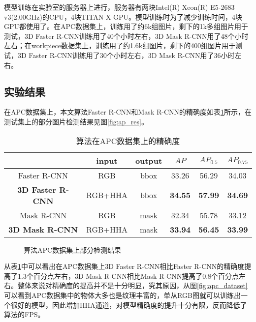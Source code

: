 {\kai 模型训练}在实验室的服务器上进行，服务器有两块Intel(R) Xeon(R) E5-2683 v3(2.00GHz)的CPU，4块TITAN X GPU。模型训练时为了减少训练时间，4块GPU都使用了。在APC数据集上，训练用了约6k组图片，剩下的1k多组图片用于测试，3D Faster R-CNN训练用了40个小时左右，3D Mask R-CNN用了48个小时左右；在workpiece数据集上，训练用了约1.6k组图片，剩下的400组图片用于测试，3D Faster R-CNN训练用了30个小时左右，3D Mask R-CNN用了36小时左右。

\subsection{实验结果}
在APC数据集上，本文算法Faster R-CNN和Mask R-CNN的精确度如表\ref{tab:ap1}所示，在测试集上的部分图片检测结果见图\ref{fig:ap_res}。
\begin{table}[ht]
  \centering
  \caption{算法在APC数据集上的精确度}
    \begin{tabular}{cccccc}
      \toprule
      &input&output&$AP$&$AP_{0.5}$&$AP_{0.75}$ \\
      \midrule
      Faster R-CNN&RGB&bbox&33.26&56.29&34.03 \\
      \bf{3D Faster R-CNN}&RGB+HHA&bbox&\bf{34.55}&\bf{57.99}&\bf{34.69} \\
      Mask R-CNN&RGB&mask&32.34&55.78&33.12 \\
      \bf{3D Mask R-CNN}&RGB+HHA&mask&\bf{33.94}&\bf{56.45}&\bf{33.99} \\
      \bottomrule
    \end{tabular}
  \label{tab:ap1}
\end{table}
\begin{figure}[ht]
  \centering
  \hskip2pt
  \hskip2pt
  \caption{算法APC数据集上部分检测结果}
  \label{fig:apc_res}
\end{figure}
从表\ref{tab:ap1}中可以看出在APC数据集上3D Faster R-CNN相比Faster R-CNN的精确度提高了1.3个百分点左右，3D Mask R-CNN相比Mask R-CNN提高了0.8个百分点左右。整体来说对精确度的提高并不是十分明显，究其原因，从图\ref{fig:apc_dataset}可以看到APC数据集中的物体大多也是纹理丰富的，单从RGB图就可以训练出一个很好的模型，因此增加HHA通道，对模型精确度的提升十分有限，反而降低了算法的FPS。

